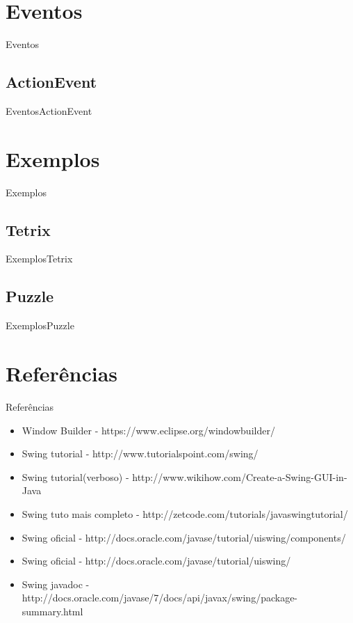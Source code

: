 \documentclass[10pt]{beamer}
\begin{document}
\section{Eventos}
\begin{frame}{Eventos}{}
\end{frame}{}
\subsection{ActionEvent}
\begin{frame}{Eventos}{ActionEvent}
\end{frame}{}
\section{Exemplos}
\begin{frame}{Exemplos}{}
\end{frame}{}
\subsection{Tetrix}
\begin{frame}{Exemplos}{Tetrix}
\end{frame}{}
\subsection{Puzzle}
\begin{frame}{Exemplos}{Puzzle}
\end{frame}{}
\section{Referências}
\begin{frame}{Referências}{}
\begin{itemize}
\item Window Builder - https://www.eclipse.org/windowbuilder/
\item Swing tutorial - http://www.tutorialspoint.com/swing/
\item Swing tutorial(verboso) - http://www.wikihow.com/Create-a-Swing-GUI-in-Java
\item Swing tuto mais completo - http://zetcode.com/tutorials/javaswingtutorial/
\item Swing oficial - http://docs.oracle.com/javase/tutorial/uiswing/components/
\item Swing oficial - http://docs.oracle.com/javase/tutorial/uiswing/
\item Swing javadoc - http://docs.oracle.com/javase/7/docs/api/javax/swing/package-summary.html
\end{itemize}
\end{frame}
\end{document}
